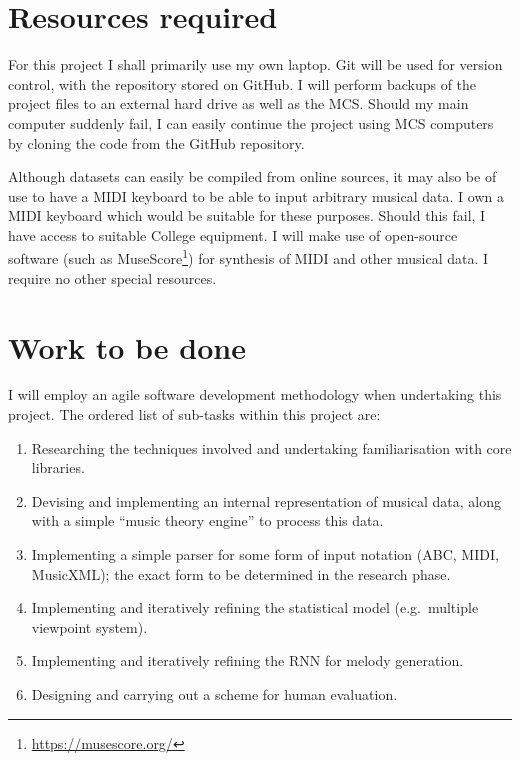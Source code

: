 \documentclass[12pt,a4paper,twoside]{article}
\begin{document}
\section{Resources required}

For this project I shall primarily use my own laptop. Git will be used for
version control, with the repository stored on GitHub. I will perform backups of
the project files to an external hard drive as well as the MCS. Should my main
computer suddenly fail, I can easily continue the project using MCS computers by
cloning the code from the GitHub repository.

Although datasets can easily be compiled from online sources, it may also be of
use to have a MIDI keyboard to be able to input arbitrary musical data. I own a
MIDI keyboard which would be suitable for these purposes. Should this fail, I
have access to suitable College equipment. I will make use of open-source
software (such as MuseScore\footnote{\url{https://musescore.org/}}) for
synthesis of MIDI and other musical data. I require no other special resources.

\section{Work to be done}

I will employ an agile software development methodology when undertaking this
project. The ordered list of sub-tasks within this project are:
\begin{enumerate}

\item Researching the techniques involved and undertaking familiarisation with
  core libraries.

\item Devising and implementing an internal representation of musical data,
	along with a simple ``music theory engine'' to process this data.  

\item Implementing a simple parser for some form of input notation (ABC, MIDI,
	MusicXML); the exact form to be determined in the research phase.  

\item Implementing and iteratively refining the statistical model (e.g.\
  multiple viewpoint system).

\item Implementing and iteratively refining the RNN for melody generation.  

\item Designing and carrying out a scheme for human evaluation.

\end{enumerate}
\end{document}
